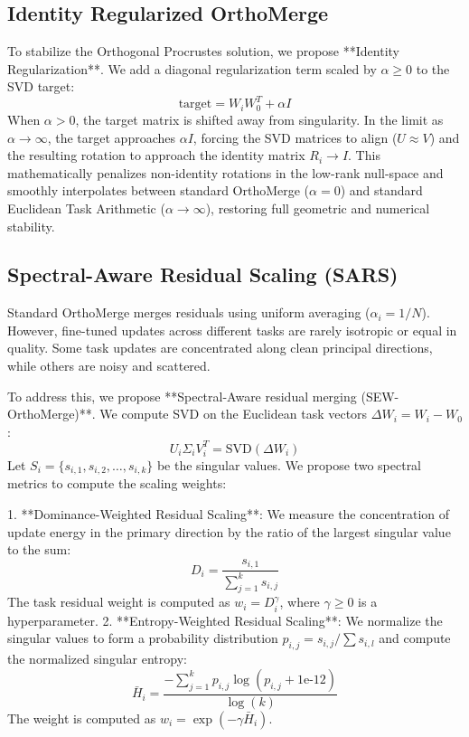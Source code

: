 \documentclass{article}
\theoremstyle{plain}
\theoremstyle{definition}
\theoremstyle{remark}
\begin{document}
\subsection{Identity Regularized OrthoMerge}
To stabilize the Orthogonal Procrustes solution, we propose **Identity Regularization**. We add a diagonal regularization term scaled by $\alpha \ge 0$ to the SVD target:
\begin{equation}
  \text{target} = W_i W_0^T + \alpha I
\end{equation}
When $\alpha > 0$, the target matrix is shifted away from singularity. In the limit as $\alpha \to \infty$, the target approaches $\alpha I$, forcing the SVD matrices to align ($U \approx V$) and the resulting rotation to approach the identity matrix $R_i \to I$. This mathematically penalizes non-identity rotations in the low-rank null-space and smoothly interpolates between standard OrthoMerge ($\alpha = 0$) and standard Euclidean Task Arithmetic ($\alpha \to \infty$), restoring full geometric and numerical stability.

\subsection{Spectral-Aware Residual Scaling (SARS)}
Standard OrthoMerge merges residuals using uniform averaging ($\alpha_i = 1/N$). However, fine-tuned updates across different tasks are rarely isotropic or equal in quality. Some task updates are concentrated along clean principal directions, while others are noisy and scattered.

To address this, we propose **Spectral-Aware residual merging (SEW-OrthoMerge)**. We compute SVD on the Euclidean task vectors $\Delta W_i = W_i - W_0$:
\begin{equation}
  U_i \Sigma_i V_i^T = \text{SVD}(\Delta W_i)
\end{equation}
Let $S_i = \{s_{i,1}, s_{i,2}, \dots, s_{i,k}\}$ be the singular values. We propose two spectral metrics to compute the scaling weights:

1. **Dominance-Weighted Residual Scaling**: We measure the concentration of update energy in the primary direction by the ratio of the largest singular value to the sum:
\begin{equation}
  D_i = \frac{s_{i,1}}{\sum_{j=1}^k s_{i,j}}
\end{equation}
The task residual weight is computed as $w_i = D_i^\gamma$, where $\gamma \ge 0$ is a hyperparameter.
2. **Entropy-Weighted Residual Scaling**: We normalize the singular values to form a probability distribution $p_{i,j} = s_{i,j} / \sum s_{i,l}$ and compute the normalized singular entropy:
\begin{equation}
  \bar{H}_i = \frac{-\sum_{j=1}^k p_{i,j} \log(p_{i,j} + 1\text{e-}12)}{\log(k)}
\end{equation}
The weight is computed as $w_i = \exp(-\gamma \bar{H}_i)$.
\end{document}
